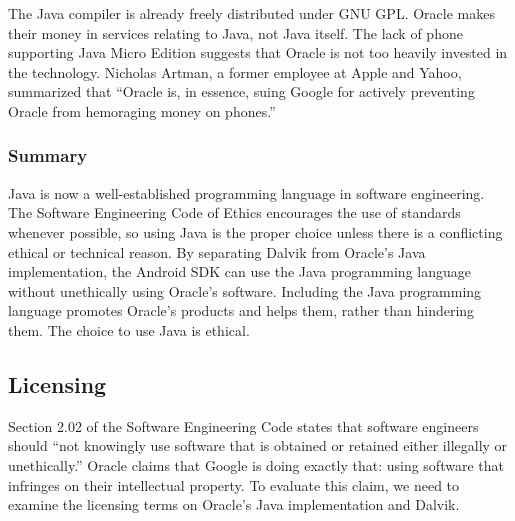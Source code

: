\documentclass[11pt]{article}
\begin{document}
\begin{multicols}{2}
The Java compiler is already freely distributed under GNU GPL.  Oracle makes
their money in services relating to Java, not Java itself.  The lack of phone
supporting Java Micro Edition suggests that Oracle is not too heavily invested
in the technology.  Nicholas Artman, a former employee at Apple and Yahoo,
summarized that ``Oracle is, in essence, suing Google for actively preventing
Oracle from hemoraging money on phones.'' \cite{artman}


\subsubsection{Summary} %
\label{ssub:java-summary}

Java is now a well-established programming language in software engineering.
The Software Engineering Code of Ethics encourages the use of standards whenever
possible, so using Java is the proper choice unless there is a conflicting
ethical or technical reason.  By separating Dalvik from Oracle's Java
implementation, the Android SDK can use the Java programming language without
unethically using Oracle's software.  Including the Java programming language
promotes Oracle's products and helps them, rather than hindering them.  The
choice to use Java is ethical.



\subsection{Licensing} %
\label{sub:licensing}

Section 2.02 of the Software Engineering Code states that software engineers
should ``not knowingly use software that is obtained or retained either
illegally or unethically.'' \cite[\S 2.02]{secode}  Oracle claims that Google is
doing exactly that: using software that infringes on their intellectual
property.  To evaluate this claim, we need to examine the licensing terms on
Oracle's Java implementation and Dalvik.


\end{multicols}
\end{document}
